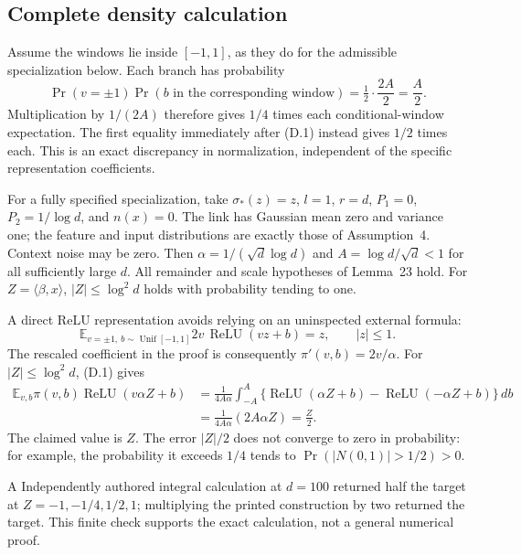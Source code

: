 \documentclass[10pt]{article}
\begin{document}
\subsection*{Complete density calculation}
Assume the windows lie inside \([-1,1]\), as they do for the admissible specialization below. Each branch has probability \[\Pr(v=\pm1)\Pr(b\text{ in the corresponding window})
 =\tfrac12\cdot \frac{2A}{2}=\frac A2.\] Multiplication by \(1/(2A)\) therefore gives \(1/4\) times each conditional-window expectation. The first equality immediately after (D.1) instead gives \(1/2\) times each. This is an exact discrepancy in normalization, independent of the specific representation coefficients.\par
For a fully specified specialization, take \(\sigma_*(z)=z\), \(l=1\), \(r=d\), \(P_1=0\), \(P_2=1/\log d\), and \(n(x)=0\). The link has Gaussian mean zero and variance one; the feature and input distributions are exactly those of Assumption 4. Context noise may be zero. Then \(\alpha=1/(\sqrt d\log d)\) and \(A=\log d/\sqrt d<1\) for all sufficiently large \(d\). All remainder and scale hypotheses of Lemma 23 hold. For \(Z=\langle\beta,x\rangle\), \(|Z|\le\log^2d\) holds with probability tending to one.\par
A direct ReLU representation avoids relying on an uninspected external formula: \[\mathbb E_{v=\pm1,\ b\sim\operatorname{Unif}[-1,1]}
       2v\,\operatorname{ReLU}(vz+b)=z,\qquad |z|\le1.\] The rescaled coefficient in the proof is consequently \(\pi'(v,b)=2v/\alpha\). For \(|Z|\le\log^2d\), (D.1) gives \[\begin{aligned}
 \mathbb E_{v,b}\pi(v,b)\operatorname{ReLU}(v\alpha Z+b)
 &=\frac{1}{4A\alpha}
   \int_{-A}^{A}\{\operatorname{ReLU}(\alpha Z+b)
                    -\operatorname{ReLU}(-\alpha Z+b)\}\,db\\
 &=\frac{1}{4A\alpha}(2A\alpha Z)=\frac Z2 .\end{aligned}\] The claimed value is \(Z\). The error \(|Z|/2\) does not converge to zero in probability: for example, the probability it exceeds \(1/4\) tends to \(\Pr(|N(0,1)|>1/2)>0\).\par
A Independently authored integral calculation at \(d=100\) returned half the target at \(Z=-1,-1/4,1/2,1\); multiplying the printed construction by two returned the target. This finite check supports the exact calculation, not a general numerical proof.\par
\end{document}
